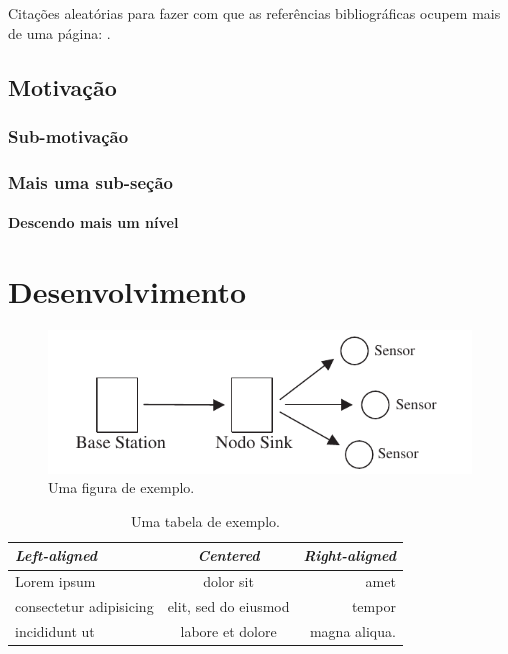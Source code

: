\documentclass[msc]{ppgccufmg}    %
\begin{document}
Citações aleatórias para fazer com que as referências bibliográficas ocupem
mais de uma página: \cite{bichsel92simple, dror01statistics, guisser92new}.


\section{Motivação}

\dummytxtb\dummytxta

\subsection{Sub-motivação}


\dummytxtc\dummytxtb

\subsection{Mais uma sub-seção}

\dummytxta\dummytxtc

\subsubsection{Descendo mais um nível}

\dummytxtb\dummytxta


\chapter{Desenvolvimento}

\dummytxtb\dummytxta\dummytxtc

\begin{figure}[t]
    \centering
    \includegraphics{img/exemplo}
    \caption{Uma figura de exemplo.}
    \label{fig:exemplo}
\end{figure}

\dummytxtb\dummytxta\dummytxtc\dummytxtb

\begin{table}[t]
    \caption{Uma tabela de exemplo.}
    {\centering
    \begin{tabular}{lcr} \toprule
    \emph{Left-aligned} & \emph{Centered} & \emph{Right-aligned} \\ \midrule
    Lorem ipsum & dolor sit & amet \\
    consectetur adipisicing & elit, sed do eiusmod & tempor \\
    incididunt ut & labore et dolore & magna aliqua. \\ \bottomrule
    \end{tabular}\par
    }
\end{table}
\end{document}
